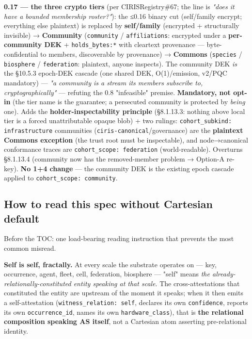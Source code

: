 \documentclass[11pt]{article}
\begin{document}
\textbf{0.17 — the three crypto tiers} (per CIRISRegistry\#67; the line is \textit{"does it have a bounded membership roster?"}): the ≤0.16 binary cut (self/family encrypt; everything else plaintext) is replaced by \textbf{self/family} (encrypted + structurally invisible) → \textbf{Community} (\texttt{community} / \texttt{affiliations}: encrypted under a \textbf{per-community DEK} + \texttt{holds\_bytes:*} with cleartext provenance — byte-confidential to members, discoverable by provenance) → \textbf{Commons} (\texttt{species} / \texttt{biosphere} / \texttt{federation}: plaintext, anyone inspects). The community DEK \textit{is} the §10.5.3 epoch-DEK cascade (one shared DEK, O(1)/emission, v2/PQC mandatory) — \textit{"a community is a stream its members subscribe to, cryptographically"} — refuting the 0.8 "infeasible" premise. \textbf{Mandatory, not opt-in} (the tier name is the guarantee; a persecuted community is protected by \textit{being} one). Adds the \textbf{holder-inspectability principle} (§8.1.13.3: nothing above local tier is a forced unattributable opaque blob) + two rulings: \texttt{cohort\_subkind: infrastructure} communities (\texttt{ciris-canonical}/governance) are the \textbf{plaintext Commons exception} (the trust root must be inspectable), and node→canonical conformance traces are \texttt{cohort\_scope: federation} (world-readable). Overturns §8.1.13.4 (community now has the removed-member problem → Option-A re-key). \textbf{No 1+4 change} — the community DEK is the existing epoch cascade applied to \texttt{cohort\_scope: community}.


\subsection*{How to read this spec without Cartesian default}


Before the TOC: one load-bearing reading instruction that prevents the most common misread.


\textbf{Self is self, fractally.} At every scale the substrate operates on — key, occurrence, agent, fleet, cell, federation, biosphere — "self" means \textit{the already-relationally-constituted entity speaking at that scale}. The cross-attestations that constituted the entity are upstream of the moment it speaks; when it then emits a self-attestation (\texttt{witness\_relation: self}, declares its own \texttt{confidence}, reports its own \texttt{occurrence\_id}, names its own \texttt{hardware\_class}), that is \textbf{the relational composition speaking AS itself}, not a Cartesian atom asserting pre-relational identity.
\end{document}
